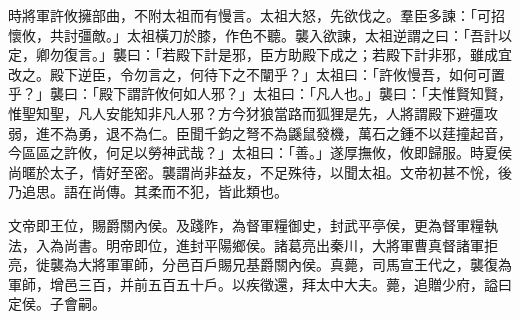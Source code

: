 \begin{pinyinscope}
時將軍許攸擁部曲，不附太祖而有慢言。太祖大怒，先欲伐之。羣臣多諫：「可招懷攸，共討彊敵。」太祖橫刀於膝，作色不聽。襲入欲諫，太祖逆謂之曰：「吾計以定，卿勿復言。」襲曰：「若殿下計是邪，臣方助殿下成之；若殿下計非邪，雖成宜改之。殿下逆臣，令勿言之，何待下之不闡乎？」太祖曰：「許攸慢吾，如何可置乎？」襲曰：「殿下謂許攸何如人邪？」太祖曰：「凡人也。」襲曰：「夫惟賢知賢，惟聖知聖，凡人安能知非凡人邪？方今犲狼當路而狐狸是先，人將謂殿下避彊攻弱，進不為勇，退不為仁。臣聞千鈞之弩不為鼷鼠發機，萬石之鍾不以莛撞起音，今區區之許攸，何足以勞神武哉？」太祖曰：「善。」遂厚撫攸，攸即歸服。時夏侯尚暱於太子，情好至密。襲謂尚非益友，不足殊待，以聞太祖。文帝初甚不恱，後乃追思。語在尚傳。其柔而不犯，皆此類也。

文帝即王位，賜爵關內侯。及踐阼，為督軍糧御史，封武平亭侯，更為督軍糧執法，入為尚書。明帝即位，進封平陽鄉侯。諸葛亮出秦川，大將軍曹真督諸軍拒亮，徙襲為大將軍軍師，分邑百戶賜兄基爵關內侯。真薨，司馬宣王代之，襲復為軍師，增邑三百，并前五百五十戶。以疾徵還，拜太中大夫。薨，追贈少府，謚曰定侯。子會嗣。


\end{pinyinscope}
